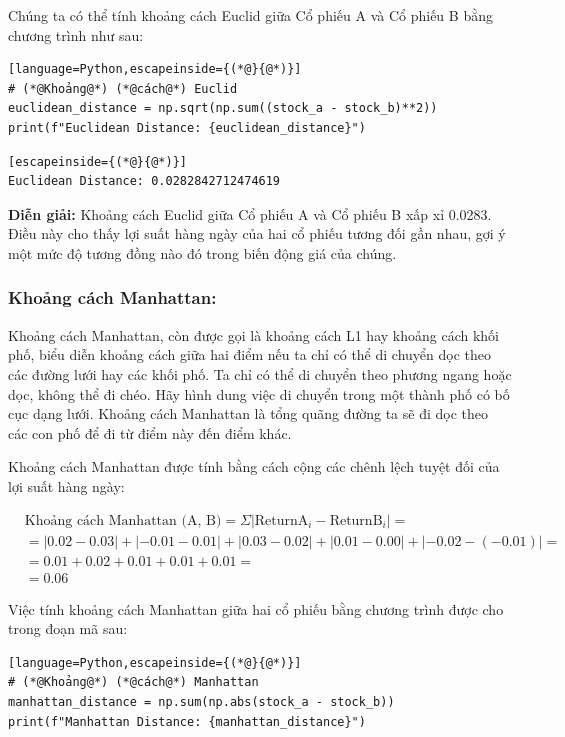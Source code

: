 Chúng ta có thể tính khoảng cách Euclid giữa Cổ phiếu A và Cổ phiếu B bằng chương trình như sau:

\begin{lstlisting}[language=Python,escapeinside={(*@}{@*)}]
# (*@Khoảng@*) (*@cách@*) Euclid
euclidean_distance = np.sqrt(np.sum((stock_a - stock_b)**2))
print(f"Euclidean Distance: {euclidean_distance}")
\end{lstlisting}

\begin{lstlisting}[escapeinside={(*@}{@*)}]
Euclidean Distance: 0.0282842712474619
\end{lstlisting}

\textbf{Diễn giải:} Khoảng cách Euclid giữa Cổ phiếu A và Cổ phiếu B xấp xỉ 0.0283. Điều này cho thấy lợi suất hàng ngày của hai cổ phiếu tương đối gần nhau, gợi ý một mức độ tương đồng nào đó trong biến động giá của chúng.

\subsubsection*{Khoảng cách Manhattan:}

Khoảng cách Manhattan, còn được gọi là khoảng cách L1 hay khoảng cách khối phố, biểu diễn khoảng cách giữa hai điểm nếu ta chỉ có thể di chuyển dọc theo các đường lưới hay các khối phố. Ta chỉ có thể di chuyển theo phương ngang hoặc dọc, không thể đi chéo. Hãy hình dung việc di chuyển trong một thành phố có bố cục dạng lưới. Khoảng cách Manhattan là tổng quãng đường ta sẽ đi dọc theo các con phố để đi từ điểm này đến điểm khác.

Khoảng cách Manhattan được tính bằng cách cộng các chênh lệch tuyệt đối của lợi suất hàng ngày:

\begin{align*}
    & \text{Khoảng cách Manhattan (A, B)} = \Sigma|\text{ReturnA}_i - \text{ReturnB}_i| = \\
    &= |0.02 - 0.03| + |-0.01 - 0.01| + |0.03 - 0.02| + |0.01 - 0.00| + |-0.02 - (-0.01)| = \\
    &= 0.01 + 0.02 + 0.01 + 0.01 + 0.01 = \\
    &= 0.06
\end{align*}

Việc tính khoảng cách Manhattan giữa hai cổ phiếu bằng chương trình được cho trong đoạn mã sau:

\begin{lstlisting}[language=Python,escapeinside={(*@}{@*)}]
# (*@Khoảng@*) (*@cách@*) Manhattan
manhattan_distance = np.sum(np.abs(stock_a - stock_b))
print(f"Manhattan Distance: {manhattan_distance}")
\end{lstlisting}

